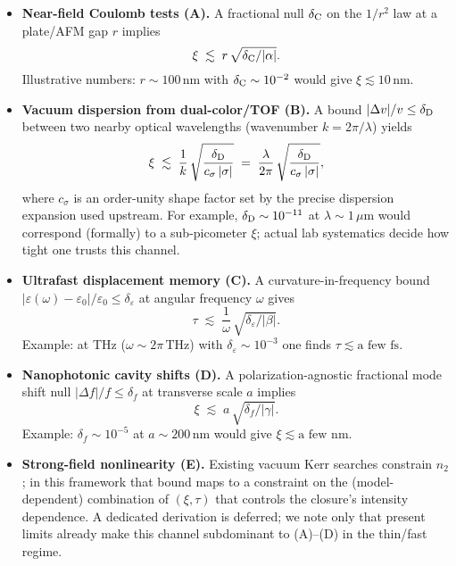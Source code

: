 \begin{itemize}
  \item \textbf{Near-field Coulomb tests (A).} A fractional null $\delta_{\rm C}$ on the $1/r^2$ law at a plate/AFM gap $r$ implies
  \[
  \xi \;\lesssim\; r\,\sqrt{\delta_{\rm C}/|\alpha|}.
  \]
  Illustrative numbers: $r\sim 100\,\mathrm{nm}$ with $\delta_{\rm C}\sim10^{-2}$ would give $\xi\lesssim10\,\mathrm{nm}$.

  \item \textbf{Vacuum dispersion from dual-color/TOF (B).} A bound $|\Delta v|/v\le \delta_{\rm D}$ between two nearby optical wavelengths (wavenumber $k=2\pi/\lambda$) yields
  \[
  \xi \;\lesssim\; \frac{1}{k}\,\sqrt{\frac{\delta_{\rm D}}{c_\sigma\,|\sigma|}}
  \;=\; \frac{\lambda}{2\pi}\,\sqrt{\frac{\delta_{\rm D}}{c_\sigma\,|\sigma|}},
  \]
  where $c_\sigma$ is an order-unity shape factor set by the precise dispersion expansion used upstream. For example, $\delta_{\rm D}\sim10^{-11}$ at $\lambda\sim1\,\mu\mathrm{m}$ would correspond (formally) to a sub-picometer $\xi$; actual lab systematics decide how tight one trusts this channel.

  \item \textbf{Ultrafast displacement memory (C).} A curvature-in-frequency bound $|\varepsilon(\omega)-\varepsilon_0|/\varepsilon_0\le\delta_\varepsilon$ at angular frequency $\omega$ gives
  \[
  \tau \;\lesssim\; \frac{1}{\omega}\,\sqrt{\delta_\varepsilon/|\beta|}.
  \]
  Example: at THz ($\omega\!\sim\!2\pi\,\mathrm{THz}$) with $\delta_\varepsilon\sim10^{-3}$ one finds $\tau\lesssim\text{a few }\mathrm{fs}$.

  \item \textbf{Nanophotonic cavity shifts (D).} A polarization-agnostic fractional mode shift null $|\Delta f|/f\le\delta_f$ at transverse scale $a$ implies
  \[
  \xi \;\lesssim\; a\,\sqrt{\delta_f/|\gamma|}.
  \]
  Example: $\delta_f\sim10^{-5}$ at $a\sim200\,\mathrm{nm}$ would give $\xi\lesssim\text{a few }\mathrm{nm}$.

  \item \textbf{Strong-field nonlinearity (E).} Existing vacuum Kerr searches constrain $n_2$; in this framework that bound maps to a constraint on the (model-dependent) combination of $(\xi,\tau)$ that controls the closure’s intensity dependence. A dedicated derivation is deferred; we note only that present limits already make this channel subdominant to (A)–(D) in the thin/fast regime.
\end{itemize}

